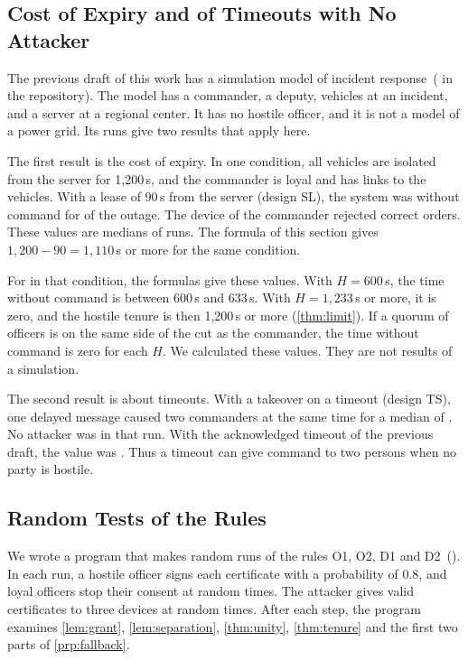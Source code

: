 \subsection{Cost of Expiry and of Timeouts with No Attacker}
\label{sec:baseline}

The previous draft of this work has a simulation model of incident
response~( in the repository). The model has a commander, a deputy,
vehicles at an incident, and a server at a regional center. It has no hostile officer, and
it is not a model of a power grid. Its \tbTotalRuns{} runs give two results that apply
here. 

The first result is the cost of expiry. In one condition, all vehicles are isolated from
the server for 1{,}200\,s, and the commander is loyal and has links to the vehicles. With a
lease of 90\,s from the server (design SL), the system was without command for
\tbPBNoCommand{} of the outage. The device of the commander rejected \tbPBRefused{} correct
orders. These values are medians of \tbSeedsPerCell{} runs. The formula of this section
gives $1{,}200 - 90 = 1{,}110$\,s or more for the same condition.

For \sys{} in that condition, the formulas give these values. With $H = 600$\,s, the time
without command is between 600\,s and 633\,s. With $H = 1{,}233$\,s or more, it is zero,
and the hostile tenure is then 1{,}200\,s or more (\cref{thm:limit}). If a quorum of
officers is on the same side of the cut as the commander, the time without command is zero
for each $H$. We calculated these values. They are not results of a simulation.

The second result is about timeouts. With a takeover on a timeout (design TS), one delayed
message caused two commanders at the same time for a median of \tbRelayOverlap{}. No
attacker was in that run. With the acknowledged timeout of the previous draft, the value
was \tbRelayOverlapAcked{}. Thus a timeout can give command to two persons when no party is
hostile.

\subsection{Random Tests of the Rules}
\label{sec:random}

We wrote a program that makes random runs of the rules O1, O2, D1 and
D2~(). In each run, a hostile officer signs each
certificate with a probability of 0.8, and loyal officers stop their consent at random
times. The attacker gives valid certificates to three devices at random times. After each
step, the program examines \cref{lem:grant}, \cref{lem:separation}, \cref{thm:unity},
\cref{thm:tenure} and the first two parts of \cref{prp:fallback}.

